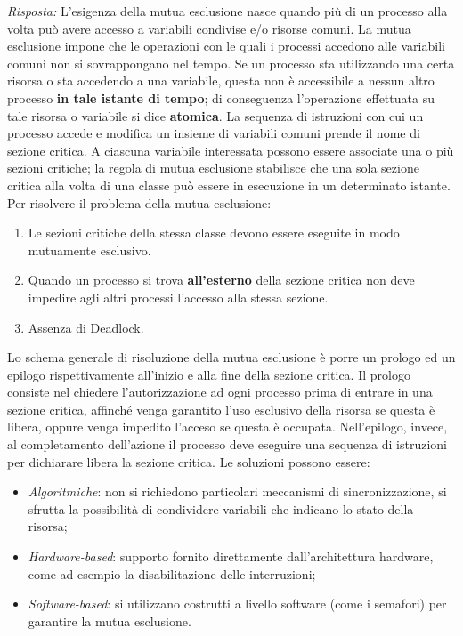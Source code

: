 \documentclass{article}
\newenvironment{solution}
    {\textit{Risposta:}}
    {}
\begin{document}
\begin{solution}
L’esigenza della mutua esclusione nasce quando più di un processo alla volta può avere accesso a variabili condivise e/o risorse comuni.
\newline
La mutua esclusione impone che le operazioni con le quali i processi accedono alle variabili comuni non si sovrappongano nel tempo.
\newline
Se un processo sta utilizzando una certa risorsa o sta accedendo a una variabile, questa non è accessibile a nessun altro processo \textbf{in tale istante di tempo}; di conseguenza l’operazione effettuata su tale risorsa o variabile si dice \textbf{atomica}.
\newline
\newline
La sequenza di istruzioni con cui un processo accede e modifica un insieme di variabili comuni prende il nome di sezione critica.
A ciascuna variabile interessata possono essere associate una o più sezioni critiche; la regola di mutua esclusione stabilisce che una sola sezione critica alla volta di una classe può essere in esecuzione in un determinato istante.
\newline
\newline
Per risolvere il problema della mutua esclusione:
\begin{enumerate}
    \item Le sezioni critiche della stessa classe devono essere eseguite in modo mutuamente esclusivo.
    \item Quando un processo si trova \textbf{all'esterno} della sezione critica non deve impedire agli altri processi l’accesso alla stessa sezione.
    \item Assenza di Deadlock.
\end{enumerate}
Lo schema generale di risoluzione della mutua esclusione è porre un prologo ed un epilogo rispettivamente all’inizio e alla fine della sezione critica.
\newline
Il prologo consiste nel chiedere l’autorizzazione ad ogni processo prima di entrare in una sezione critica, affinché venga garantito l’uso esclusivo della risorsa se questa è libera, oppure venga impedito l’acceso se questa è occupata. 
\newline
Nell’epilogo, invece, al completamento dell’azione il processo deve eseguire una sequenza di istruzioni per dichiarare libera la sezione critica. Le soluzioni possono essere:
\begin{itemize}
    \item \emph{Algoritmiche}: non si richiedono particolari meccanismi di sincronizzazione, si sfrutta la possibilità di condividere variabili che indicano lo stato della risorsa;
    \item \emph{Hardware-based}: supporto fornito direttamente dall’architettura hardware, come ad esempio la disabilitazione delle interruzioni;
    \item \emph{Software-based}: si utilizzano costrutti a livello software (come i semafori) per garantire la mutua esclusione.
\end{itemize}
\end{solution}
\end{document}
